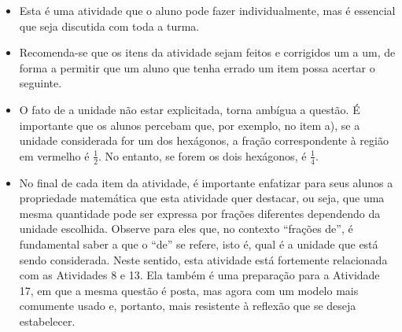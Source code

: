 \begin{multicols}{2}
\begin{orientacoes}
\begin{itemize} %
    \item       Esta é uma atividade que o aluno pode fazer individualmente, mas é essencial que seja discutida com toda a turma.
    \item       Recomenda-se que os itens da atividade sejam feitos e corrigidos um a um, de forma a permitir que um aluno que tenha errado um item possa acertar o seguinte.
    \item       O fato de a unidade não estar explicitada, torna ambígua a questão. É importante que os alunos percebam que, por exemplo, no item a), se a unidade considerada for um dos hexágonos, a fração correspondente à região em vermelho é $\frac{1}{2}$. No entanto, se forem os dois hexágonos, é $\frac{1}{4}$.
    \item       No final de cada item da atividade, é importante enfatizar para seus alunos a propriedade matemática que esta atividade quer destacar, ou seja, que uma mesma quantidade pode ser expressa por frações diferentes dependendo da unidade escolhida. Observe para eles que, no contexto       ``frações de'', é fundamental saber a que o       ``de''     se refere, isto é, qual é a unidade que está sendo considerada. Neste sentido, esta atividade está fortemente relacionada com as Atividades 8 e 13. Ela também é uma preparação para a Atividade 17, em que a mesma questão é posta, mas agora com um modelo mais comumente usado e, portanto, mais resistente à reflexão que se deseja estabelecer.
\end{itemize} %
\end{orientacoes}

\def \tripinha{ (30:4) -- (90:4) -- (150:4)--(210:4)--(270:4)--(330:4) [shift={({4*sqrt(3)},0)}] --(270:4) -- (330:4) -- (30:4) -- (90:4)--(150:4)--cycle}


\def \tripa{ (30:4) -- (90:4) -- (150:4)--(210:4)--(270:4)--(330:4) [shift={({4*sqrt(3)},0)}] --(270:4) -- (330:4) [shift={({4*sqrt(3)},0)}]--  (270:4) -- (330:4) -- (30:4) -- (90:4)--(150:4) [shift={({-4*sqrt(3)},0)}] -- (90:4) -- (150:4)--cycle;}


\end{multicols}
